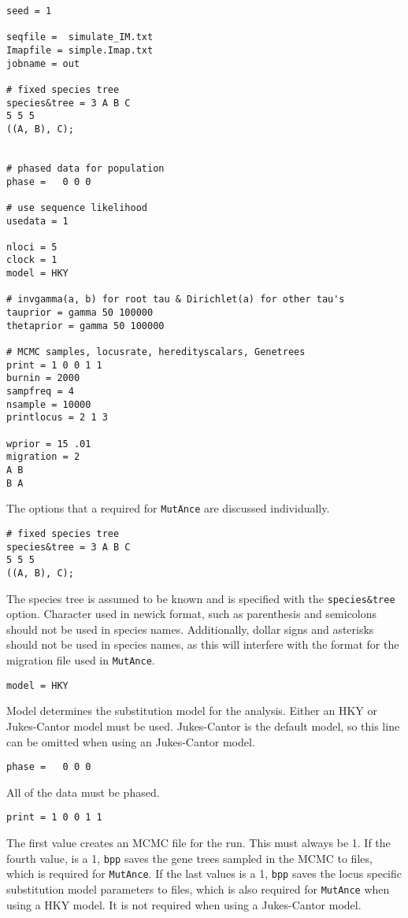 \documentclass[11pt]{article}
\begin{document}
\begin{Verbatim}[frame=single, fontsize=\small]
seed = 1

seqfile =  simulate_IM.txt
Imapfile = simple.Imap.txt
jobname = out

# fixed species tree
species&tree = 3 A B C
5 5 5
((A, B), C);


# phased data for population
phase =   0 0 0

# use sequence likelihood
usedata = 1

nloci = 5
clock = 1
model = HKY

# invgamma(a, b) for root tau & Dirichlet(a) for other tau's
tauprior = gamma 50 100000
thetaprior = gamma 50 100000

# MCMC samples, locusrate, heredityscalars, Genetrees
print = 1 0 0 1 1
burnin = 2000
sampfreq = 4
nsample = 10000
printlocus = 2 1 3

wprior = 15 .01
migration = 2
A B
B A
\end{Verbatim}
The options that a required for \texttt{MutAnce} are discussed individually. 
\begin{Verbatim}[frame=single, fontsize=\small]
# fixed species tree
species&tree = 3 A B C
5 5 5
((A, B), C);
\end{Verbatim}
The species tree is assumed to be known and is specified with the \texttt{species\&tree} option. Character used in newick format, such as parenthesis and semicolons should not be used in species names. Additionally, dollar signs and asterisks should not be used in species names, as this will interfere with the format for the migration file used in \texttt{MutAnce}.
\begin{Verbatim}[frame=single, fontsize=\small]
model = HKY
\end{Verbatim}
Model determines the substitution model for the analysis. 
Either an HKY or Jukes-Cantor model must be used. 
Jukes-Cantor is the default model, so this line can be omitted when using an Jukes-Cantor model.

\begin{Verbatim}[frame=single, fontsize=\small]
phase =   0 0 0
\end{Verbatim}
All of the data must be phased. 

\begin{Verbatim}[frame=single, fontsize=\small]
print = 1 0 0 1 1
\end{Verbatim}
The first value creates an MCMC file for the run. 
This must always be 1. 
If the fourth value, is a 1, \texttt{bpp} saves the gene trees sampled in the MCMC to files, which is required for \texttt{MutAnce}. 
If the last values is a 1, \texttt{bpp} saves the locus specific substitution model parameters to files, which is also required for \texttt{MutAnce} when using a HKY model.
It is not required when using a Jukes-Cantor model.
\end{document}
